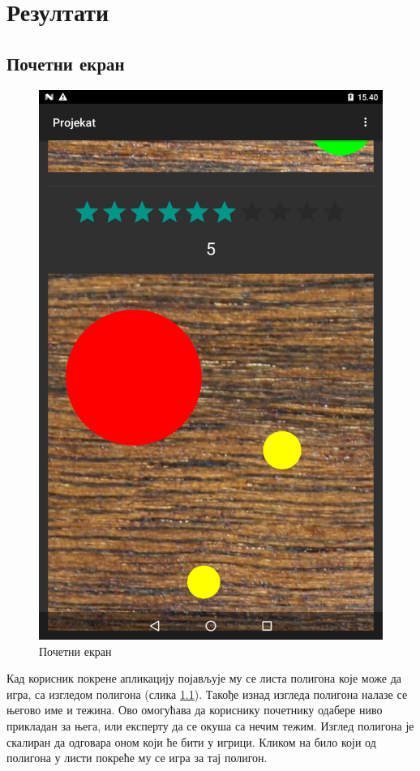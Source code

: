 \chapter{Резултати} \label{UseCases}

\section{Почетни екран} \label{UseCases:Main}

\begin{figure}[htb!]
\begin{center}
\includegraphics[scale=.1]{pictures/main/Basic}
\caption{Почетни екран}\label{fig:mainBasic}
\end{center}
\end{figure}
Кад корисник покрене апликацију појављује му се листа полигона које може да игра, са изгледом полигона (слика \ref{fig:mainBasic}). Такође изнад изгледа полигона налазе се његово име и тежина. Ово омогућава да кориснику почетнику одабере ниво прикладан за њега, или експерту да се окуша са нечим тежим. Изглед полигона је скалиран да одговара оном који ће бити у игрици. Кликом на било који од полигона у листи покреће му се игра за тај полигон.

